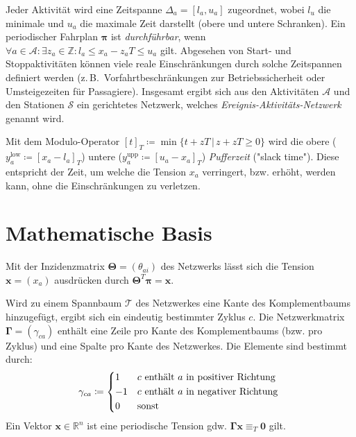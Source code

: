 \documentclass[accentcolor = tud11b, a4paper, 11pt, twocolumn]{scrartcl}
\newcommand{\R}{\ensuremath{\mathbb{R}}}
\newcommand{\Z}{\ensuremath{\mathbb{Z}}}
\newcommand{\mat}[1]{\boldsymbol{\mathbf{#1}}}
\renewcommand{\vec}[1]{\boldsymbol{\mathbf{#1}}}
\newcommand{\zB}{z.\,B.~}
\begin{document}
		Jeder Aktivität wird eine Zeitspanne \( \Delta_a = [l_a, u_a] \) zugeordnet, wobei \( l_u \) die minimale und \( u_a \) die maximale Zeit darstellt (obere und untere Schranken). Ein periodischer Fahrplan \( \vec{\pi} \) ist \emph{durchführbar}, wenn \( \forall a \in \mathcal{A} : \exists z_a \in \Z : l_a \leq x_a - z_a T \leq u_a \) gilt. Abgesehen von Start- und Stoppaktivitäten können viele reale Einschränkungen durch solche Zeitspannen definiert werden (\zB Vorfahrtbeschränkungen zur Betriebssicherheit oder Umsteigezeiten für Passagiere). Insgesamt ergibt sich aus den Aktivitäten \(\mathcal{A}\) und den Stationen \(\mathcal{S}\) ein gerichtetes Netzwerk, welches \emph{Ereignis-Aktivitäts-Netzwerk} genannt wird.
		
		Mit dem Modulo-Operator \( [t]_T \coloneqq \min \big\{ t + zT \,\vert\, z + zT \geq 0 \big\} \) wird die obere (\( y_a^\text{low} \coloneqq [x_a - l_a]_T \)) untere (\( y_a^\text{upp} \coloneqq [u_a - x_a]_T \)) \emph{Pufferzeit} ("slack time"). Diese entspricht der Zeit, um welche die Tension \(x_a\) verringert, bzw. erhöht, werden kann, ohne die Einschränkungen zu verletzen.
		
	
	\section{Mathematische Basis} 
		Mit der Inzidenzmatrix \( \mat{\Theta} = (\theta_{ai}) \) des Netzwerks lässt sich die Tension \( \vec{x} = (x_a) \) ausdrücken durch \( \mat{\Theta}^T \vec{\pi} = \vec{x} \).
		
		Wird zu einem Spannbaum \(\mathcal{T}\) des Netzwerkes eine Kante des Komplementbaums hinzugefügt, ergibt sich ein eindeutig bestimmter Zyklus \(c\). Die Netzwerkmatrix \( \mat{\Gamma} = (\gamma_{ca}) \) enthält eine Zeile pro Kante des Komplementbaums (bzw. pro Zyklus) und eine Spalte pro Kante des Netzwerkes. Die Elemente sind bestimmt durch:
		\begin{equation*}
			\gamma_{ca} \coloneqq
				\begin{cases*}
					1  & \(c\) enthält \(a\) in positiver Richtung \\
					-1 & \(c\) enthält \(a\) in negativer Richtung \\
					0  & sonst
				\end{cases*}
		\end{equation*}
		Ein Vektor \( \vec{x} \in \R^n \) ist eine periodische Tension gdw. \( \mat{\Gamma} \vec{x} \equiv_T \vec{0} \) gilt.
		
\end{document}
